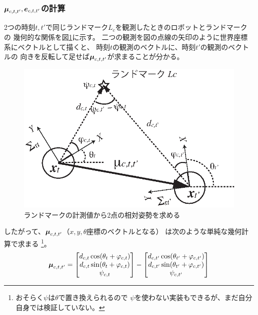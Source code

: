 

\subsubsection{$\boldsymbol{\mu}_{c,t,t'}, \boldsymbol{e}_{c,t,t'}$の計算}

2つの時刻$t,t'$で同じランドマーク$L_c$を観測したときのロボットとランドマークの
幾何的な関係を図\ref{fig:two_poses}に示す。
二つの観測を図の点線の矢印のように世界座標系にベクトルとして描くと、
時刻$t$の観測のベクトルに、時刻$t'$の観測のベクトルの
向きを反転して足せば$\boldsymbol{\mu}_{c,t,t'}$が求まることが分かる。


\begin{figure}[htbp]
	\begin{center}
		\includegraphics[width=0.5\linewidth]{./figs/two_poses.eps}
		\caption{ランドマークの計測値から2点の相対姿勢を求める}
		\label{fig:two_poses}
	\end{center}
\end{figure}

したがって、$\boldsymbol{\mu}_{c,t,t'}$（$x,y,\theta$座標のベクトルとなる）
は次のような単純な幾何計算で求まる
\footnote{おそらく$\psi$は$\theta$で置き換えられるので
$\psi$を使わない実装もできるが、まだ自分自身では検証していない。}。
\begin{align}
	\boldsymbol{\mu}_{c,t,t'} =
	\begin{bmatrix}
	d_{c,t} \cos(\theta_t + \varphi_{c,t}) \\
	d_{c,t} \sin(\theta_t + \varphi_{c,t}) \\
	\psi_{c,t}
	\end{bmatrix}
	- 
	\begin{bmatrix}
	d_{c,t'} \cos(\theta_{t'} + \varphi_{c,t'}) \\
	d_{c,t'} \sin(\theta_{t'} + \varphi_{c,t'}) \\
	\psi_{c,t'}
	\end{bmatrix}
\end{align}

